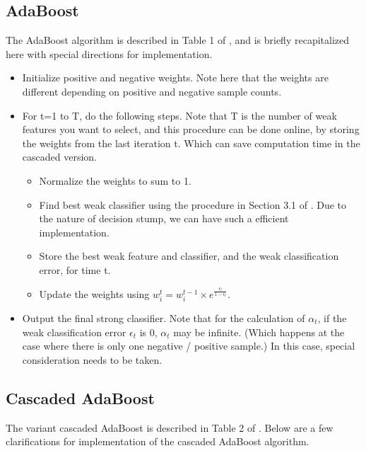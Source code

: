 \documentclass[12pt]{article}
\begin{document}
\subsection{AdaBoost}
The AdaBoost algorithm is described in Table 1 of \cite{Viola2004}, and is briefly recapitalized here with special directions for implementation.
\begin{itemize}
\item Initialize positive and negative weights. Note here that the weights are different depending on positive and negative sample counts.
\item For t=1 to T, do the following steps. Note that T is the number of weak features you want to select, and this procedure can be done online, by storing the weights from the last iteration t. Which can save computation time in the cascaded version.
\begin{itemize}
\item Normalize the weights to sum to 1.
\item Find best weak classifier using the procedure in Section 3.1 of \cite{Viola2004}. Due to the nature of decision stump, we can have such a efficient implementation.
\item Store the best weak feature and classifier, and the weak classification error, for time t.
\item Update the weights using $w_i^t=w_i^{t-1}\times e^{\frac{\epsilon_t}{1-\epsilon_t}}$.
\end{itemize}
\item Output the final strong classifier. Note that for the calculation of $\alpha_t$,  if the weak classification error $\epsilon_t$ is 0, $\alpha_t$ may be infinite. (Which happens at the case where there is only one negative / positive sample.) In this case, special consideration needs to be taken.
\end{itemize}

\subsection{Cascaded AdaBoost}
The variant cascaded AdaBoost is described in Table 2 of \cite{Viola2004}. Below are a few clarifications for implementation of the cascaded AdaBoost algorithm.
\end{document}

